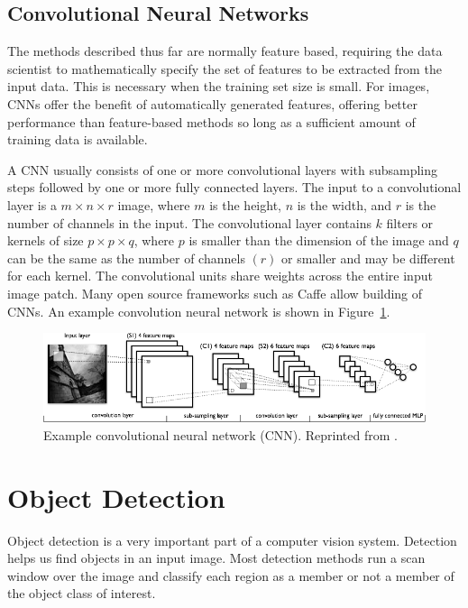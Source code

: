 \subsection{Convolutional Neural Networks}
The methods described thus far are normally feature based, requiring the data scientist to mathematically specify the set of features to be extracted from the input data. This is necessary when the training set size is small. For images, CNNs offer the benefit of automatically generated features, offering better performance than feature-based methods so long as a sufficient amount of training data is available.

A CNN usually consists of one or more convolutional layers with subsampling steps followed by one or more fully connected layers. The input to a convolutional layer is a $ m \times n \times r $ image, where $m$ is the height, $n$ is the width, and $r$ is the number of channels in the input. The convolutional layer contains $k$ filters or kernels of size $ p \times p \times q $, where $p$ is smaller than the dimension of the image and $q$ can be the same as the number of channels $(r)$ or smaller and may be different for each kernel. The convolutional units share weights across the entire input image patch. Many open source frameworks such as Caffe allow building of CNNs. An example convolution neural network is shown in Figure~\ref{fig:cnn}.

\begin{figure}[t]
  \centering
  \includegraphics[width=6in]{figures/cnn.jpg}   
  \caption[cnn]{Example convolutional neural network (CNN). Reprinted from .}
  \label{fig:cnn}
\end{figure}



\section{Object Detection}
\label{Object Detection}
Object detection is a very important part of a computer vision system. Detection helps us find objects in an input image. Most detection methods run a scan window over the image and classify each region as a member or not a member of the object class of interest.



